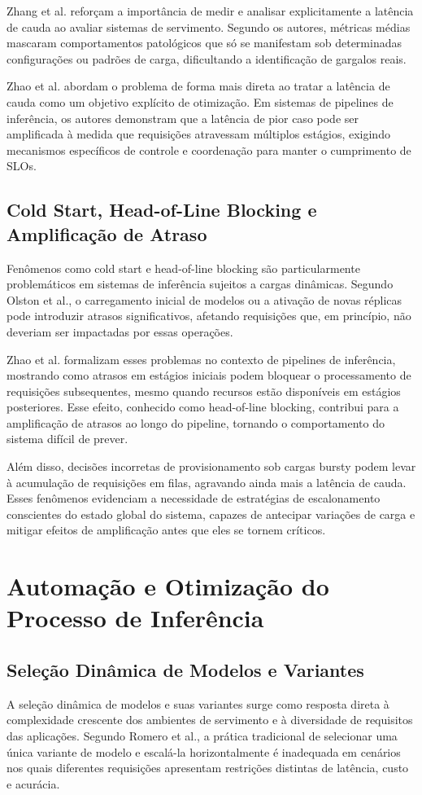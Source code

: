 Zhang et al. reforçam a importância de medir e analisar explicitamente a latência de cauda ao avaliar sistemas de servimento. Segundo os autores, métricas médias mascaram comportamentos patológicos que só se manifestam sob determinadas configurações ou padrões de carga, dificultando a identificação de gargalos reais.

Zhao et al. abordam o problema de forma mais direta ao tratar a latência de cauda como um objetivo explícito de otimização. Em sistemas de pipelines de inferência, os autores demonstram que a latência de pior caso pode ser amplificada à medida que requisições atravessam múltiplos estágios, exigindo mecanismos específicos de controle e coordenação para manter o cumprimento de SLOs.
\subsection{Cold Start, Head-of-Line Blocking e Amplificação de Atraso}
Fenômenos como cold start e head-of-line blocking são particularmente problemáticos em sistemas de inferência sujeitos a cargas dinâmicas. Segundo Olston et al., o carregamento inicial de modelos ou a ativação de novas réplicas pode introduzir atrasos significativos, afetando requisições que, em princípio, não deveriam ser impactadas por essas operações.

Zhao et al. formalizam esses problemas no contexto de pipelines de inferência, mostrando como atrasos em estágios iniciais podem bloquear o processamento de requisições subsequentes, mesmo quando recursos estão disponíveis em estágios posteriores. Esse efeito, conhecido como head-of-line blocking, contribui para a amplificação de atrasos ao longo do pipeline, tornando o comportamento do sistema difícil de prever.

Além disso, decisões incorretas de provisionamento sob cargas bursty podem levar à acumulação de requisições em filas, agravando ainda mais a latência de cauda. Esses fenômenos evidenciam a necessidade de estratégias de escalonamento conscientes do estado global do sistema, capazes de antecipar variações de carga e mitigar efeitos de amplificação antes que eles se tornem críticos.

\section{Automação e Otimização do Processo de Inferência}
\subsection{Seleção Dinâmica de Modelos e Variantes}
A seleção dinâmica de modelos e suas variantes surge como resposta direta à complexidade crescente dos ambientes de servimento e à diversidade de requisitos das aplicações. Segundo Romero et al., a prática tradicional de selecionar uma única variante de modelo e escalá-la horizontalmente é inadequada em cenários nos quais diferentes requisições apresentam restrições distintas de latência, custo e acurácia.

